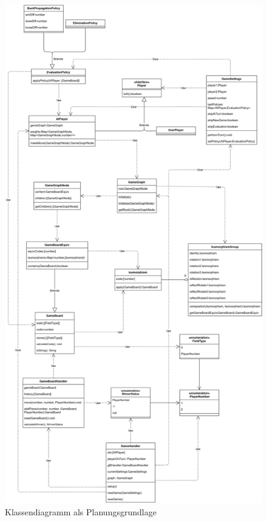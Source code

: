 \documentclass[titlepage]{scrartcl}
\begin{document}
\begin{figure}[ht]
\includegraphics[height=\textheight]{Klassendiagramme/Planung.png}
\caption{Klassendiagramm als Planungsgrundlage}
\end{figure}

\FloatBarrier
\end{document}

